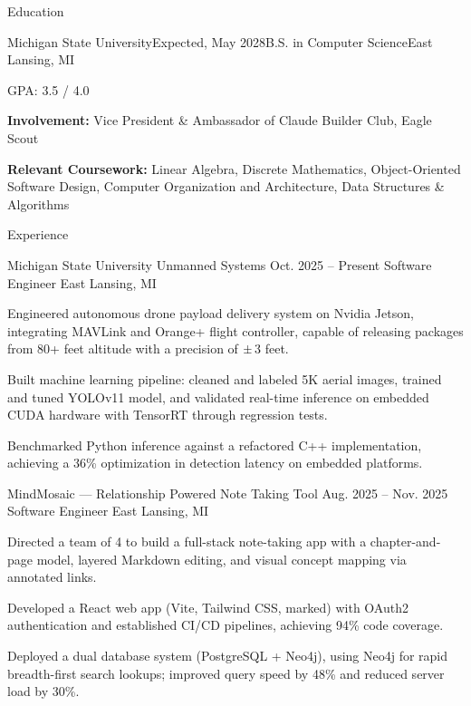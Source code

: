 \documentclass[
	11pt
]{../resume}
\begin{document}
	\begin{rSection}{E}{ducation}
		\begin{rSectionEntry}{Michigan State University}{Expected, May 2028}{B.S. in Computer Science}{}{East Lansing, MI}
			\item GPA: 3.5 / 4.0
			\item \textbf{Involvement:} Vice President \& Ambassador of Claude Builder Club, Eagle Scout
			\item \textbf{Relevant Coursework:} Linear Algebra, Discrete Mathematics, Object-Oriented Software Design, Computer Organization and Architecture, Data Structures \& Algorithms
		\end{rSectionEntry}
	\end{rSection}

	\begin{rSection}{E}{xperience}
		\begin{rSectionEntry}{Michigan State University Unmanned Systems}
			{Oct. 2025 -- Present}
			{Software Engineer}
			{}
			{East Lansing, MI}

			\item Engineered autonomous drone payload delivery system on Nvidia Jetson, integrating MAVLink and Orange+ flight controller, capable of releasing packages from 80+ feet altitude with a precision of $\pm \hspace{-0.25em}$ 3 feet.
			\item Built machine learning pipeline: cleaned and labeled 5K aerial images, trained and tuned YOLOv11 model, and validated real-time inference on embedded CUDA hardware with TensorRT through regression tests.
			\item Benchmarked Python inference against a refactored C++ implementation, achieving a 36\% optimization in detection latency on embedded platforms.
		\end{rSectionEntry}

		\begin{rSectionEntry}
			{MindMosaic --- Relationship Powered Note Taking Tool}
			{Aug. 2025 -- Nov. 2025}
			{Software Engineer}
			{}
			{East Lansing, MI}

			\item Directed a team of 4 to build a full-stack note-taking app with a chapter-and-page model, layered Markdown editing, and visual concept mapping via annotated links.
			\item Developed a React web app (Vite, Tailwind CSS, marked) with OAuth2 authentication and established CI/CD pipelines, achieving 94\% code coverage.
			\item Deployed a dual database system (PostgreSQL + Neo4j), using Neo4j for rapid breadth-first search lookups; improved query speed by 48\% and reduced server load by 30\%.
		\end{rSectionEntry}
	\end{rSection}
\end{document}
